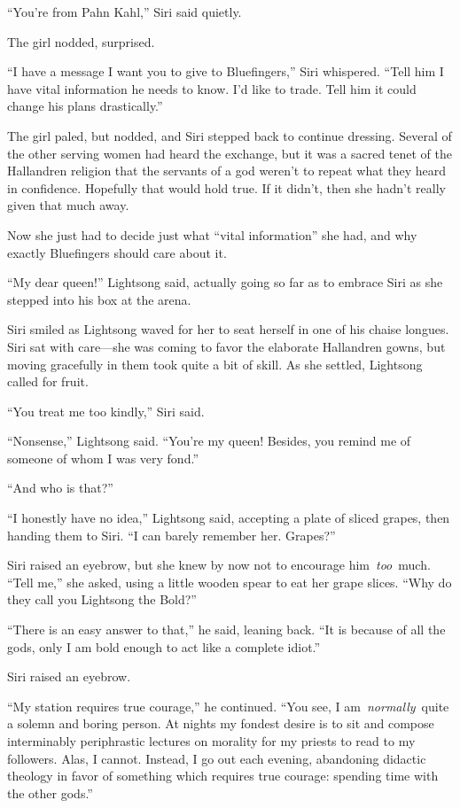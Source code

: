 “You’re from Pahn Kahl,” Siri said quietly.

The girl nodded, surprised.

“I have a message I want you to give to Bluefingers,” Siri whispered. “Tell him I have vital information he needs to know. I’d like to trade. Tell him it could change his plans drastically.”

The girl paled, but nodded, and Siri stepped back to continue dressing. Several of the other serving women had heard the exchange, but it was a sacred tenet of the Hallandren religion that the servants of a god weren’t to repeat what they heard in confidence. Hopefully that would hold true. If it didn’t, then she hadn’t really given that much away.

Now she just had to decide just what “vital information” she had, and why exactly Bluefingers should care about it.

\orn

“My dear queen!” Lightsong said, actually going so far as to embrace Siri as she stepped into his box at the arena.

Siri smiled as Lightsong waved for her to seat herself in one of his chaise longues. Siri sat with care—she was coming to favor the elaborate Hallandren gowns, but moving gracefully in them took quite a bit of skill. As she settled, Lightsong called for fruit.

“You treat me too kindly,” Siri said.

“Nonsense,” Lightsong said. “You’re my queen! Besides, you remind me of someone of whom I was very fond.”

“And who is that?”

“I honestly have no idea,” Lightsong said, accepting a plate of sliced grapes, then handing them to Siri. “I can barely remember her. Grapes?”

Siri raised an eyebrow, but she knew by now not to encourage him~\textit{too}~much. “Tell me,” she asked, using a little wooden spear to eat her grape slices. “Why do they call you Lightsong the Bold?”

“There is an easy answer to that,” he said, leaning back. “It is because of all the gods, only I am bold enough to act like a complete idiot.”

Siri raised an eyebrow.

“My station requires true courage,” he continued. “You see, I am~\textit{normally}~quite a solemn and boring person. At nights my fondest desire is to sit and compose interminably periphrastic lectures on morality for my priests to read to my followers. Alas, I cannot. Instead, I go out each evening, abandoning didactic theology in favor of something which requires true courage: spending time with the other gods.”


